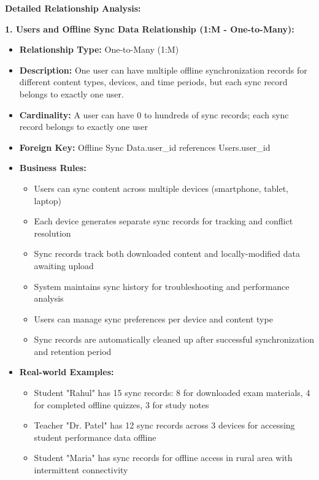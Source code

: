\documentclass[12pt,a4paper,oneside]{book}
\begin{document}
\textbf{Detailed Relationship Analysis:}

\textbf{1. Users and Offline Sync Data Relationship (1:M - One-to-Many):}
\begin{itemize}
    \item \textbf{Relationship Type:} One-to-Many (1:M)
    \item \textbf{Description:} One user can have multiple offline synchronization records for different content types, devices, and time periods, but each sync record belongs to exactly one user.
    \item \textbf{Cardinality:} A user can have 0 to hundreds of sync records; each sync record belongs to exactly one user
    \item \textbf{Foreign Key:} Offline Sync Data.user\_id references Users.user\_id
    \item \textbf{Business Rules:}
        \begin{itemize}
            \item Users can sync content across multiple devices (smartphone, tablet, laptop)
            \item Each device generates separate sync records for tracking and conflict resolution
            \item Sync records track both downloaded content and locally-modified data awaiting upload
            \item System maintains sync history for troubleshooting and performance analysis
            \item Users can manage sync preferences per device and content type
            \item Sync records are automatically cleaned up after successful synchronization and retention period
        \end{itemize}
    \item \textbf{Real-world Examples:}
        \begin{itemize}
            \item Student "Rahul" has 15 sync records: 8 for downloaded exam materials, 4 for completed offline quizzes, 3 for study notes
            \item Teacher "Dr. Patel" has 12 sync records across 3 devices for accessing student performance data offline
            \item Student "Maria" has sync records for offline access in rural area with intermittent connectivity
        \end{itemize}
\end{itemize}
\end{document}
